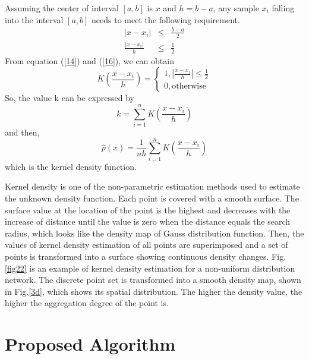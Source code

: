 \documentclass[journal,twoside,web]{ieeecolor}
\begin{document}
Assuming the center of interval $[a,b]$ is $x$ and $h=b-a$, any sample $x_i$ falling into the interval $[a, b]$ needs to meet the following requirement.
\begin{eqnarray}
|x-x_i| &\leq& \frac{b-a}{2}\\
\label{16}
\frac{|x-x_i|}{h} &\leq& \frac{1}{2}
\end{eqnarray}
From equation (\ref{14}) and (\ref{16}), we can obtain
\begin{equation}
K\left(\frac{x-x_i}{h}\right) = \left\{ \begin{array}{ll}
1, |\frac{x-x_i}{h}| \leq \frac{1}{2}\\
0, \text{otherwise}
\end{array} \right.
\end{equation}
So, the value k can be expressed by 
\begin{equation}
k = \sum_{i=1}^{n}K\left(\frac{x-x_i}{h}\right)
\end{equation}
and then, 
\begin{equation}
\label{19}
\hat{p}\left(x\right)=\frac{1}{nh}\sum_{i=1}^{n}K\left(\frac{x-x_i}{h}\right)
\end{equation}
which is the kernel density function.

\cite{b17}Kernel density is one of the non-parametric estimation methods used to estimate the unknown density function. Each point is covered with a smooth surface. The surface value at the location of the point is the highest and decreases with the increase of distance until the value is zero when the distance equals the search radius, which looks like the density map of Gauss distribution function. Then, the values of kernel density estimation of all points are superimposed and a set of points is transformed into a surface showing continuous density changes. Fig.\ref{fig22} is an example of kernel density estimation for a non-uniform distribution network. The discrete point set is transformed into a smooth density map, shown in Fig.\ref{3d}, which shows its spatial distribution. The higher the density value, the higher the aggregation degree of the point is.



\section{Proposed Algorithm}
\end{document}
